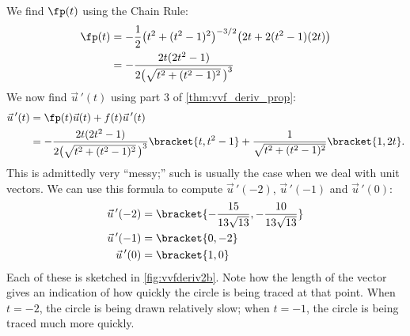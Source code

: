 {\begin{enumerate}
We find $\fp(t)$ using the Chain Rule:
\begin{align*}
\fp(t) &= -\frac12\big(t^2+(t^2-1)^2\big)^{-3/2}\big(2t+2(t^2-1)(2t)\big)\\
			&= -\frac{2t(2t^2-1)}{2\big(\sqrt{t^2+(t^2-1)^2}\,\big)^3}
\end{align*}
We now find $\vec u\,'(t)$ using part 3 of \autoref{thm:vvf_deriv_prop}:
\begin{align*}
\vec u\,'(t) &=  \fp(t)\vec u(t) + f(t)\vec u\,'(t) \\
				&=  -\frac{2t(2t^2-1)}{2\big(\sqrt{t^2+(t^2-1)^2}\,\big)^3}\bracket{t,t^2-1}+ \frac{1}{\sqrt{t^2+(t^2-1)^2}}\bracket{1,2t}.
\end{align*}
This is admittedly very ``messy;'' such is usually the case when we deal with unit vectors. We can use this formula to compute $\vec u\,'(-2)$, $\vec u\,'(-1)$ and $\vec u\,'(0)$:
\begin{align*}
\vec u\,'(-2) &=\bracket{-\frac{15}{13 \sqrt{13}},-\frac{10}{13
   \sqrt{13}}}%
   \\
\vec u\,'(-1) &=\bracket{0,-2}\\
\vec u\,'(0) &=\bracket{1,0}
\end{align*}
%
%
%
Each of these is sketched in \autoref{fig:vvfderiv2b}. Note how the length of the vector gives an indication of how quickly the circle is being traced at that point. When $t=-2$, the circle is being drawn relatively slow; when $t=-1$, the circle is being traced much more quickly.\eoehere
\end{enumerate}}

